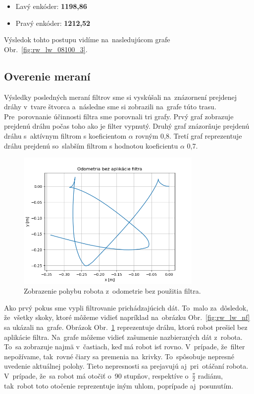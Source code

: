 \begin{itemize}
	\item Ľavý enkóder: \textbf{1198,86}
	\item Pravý enkóder: \textbf{1212,52}
\end{itemize}

Výsledok tohto postupu vidíme na~nasledujúcom grafe Obr.~\ref{fig:rw_lw_08100_3}.

\clearpage

\subsection{Overenie meraní}
\label{subsec:overenie_merani}

Výsledky posledných meraní filtrov sme si vyskúšali na~znázornení prejdenej dráhy v~tvare štvorca a~následne sme si
zobrazili na~grafe túto trasu. Pre~porovnanie účinnosti filtra sme porovnali tri grafy. Prvý graf zobrazuje prejdenú
dráhu počas toho ako je filter vypnutý. Druhý graf znázorňuje prejdenú dráhu s~aktívnym filtrom s koeficientom $\alpha$
rovným 0,8. Tretí graf reprezentuje dráhu prejdenú so~slabším filtrom s hodnotou koeficientu $\alpha$ 0,7.

\begin{figure}[!htbp]
	\begin{center}
		\includegraphics[width=0.8\textwidth]{img/stvorec_bez_filtra.png}
	\end{center}
	\caption{Zobrazenie pohybu robota z~odometrie bez použitia filtra.}
	\label{fig:stvorecBezFiltra}
\end{figure}

Ako prvý pokus sme vypli filtrovanie prichádzajúcich dát. To~malo za~dôsledok, že~všetky skoky, ktoré môžeme vidieť
napríklad na~obrázku Obr.~\ref{fig:rw_lw_nf} sa ukázali na~grafe. Obrázok Obr.~\ref{fig:stvorecBezFiltra} reprezentuje
dráhu, ktorú robot prešiel bez aplikácie filtra. Na~grafe môžeme vidieť zašumenie nazbieraných dát z~robota. To~sa
zobrazuje najmä v~častiach, keď má robot isť rovno. V~prípade, že~filter nepožívame, tak~rovné čiary sa premenia
na~krivky. To~spôsobuje nepresné uvedenie aktuálnej polohy. Tieto nepresnosti sa prejavujú aj~pri~otáčaní robota.
V~prípade, že~sa robot má otočiť o~90 stupňov, respektíve o~$\frac{\pi}{2}$ radiánu, tak~robot toto otočenie
reprezentuje iným uhlom, poprípade aj~posunutím.

